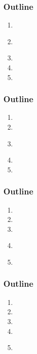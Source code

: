 \documentclass[usenames,dvipsnames]{beamer}
\begin{document}
\miniframesoff
  \begin{frame}
    \frametitle{\textbf{Outline}}
  \begin{enumerate}
    \item \introtitle
    \item \textbf{\firsttitle}
    \item \secondtitle
    \item \thirdtitle
    \item \conclusiontitle
  \end{enumerate}
  \end{frame}
\miniframeson



\miniframesoff
  \begin{frame}
    \frametitle{\textbf{Outline}}
  \begin{enumerate}
    \item \introtitle
    \item \firsttitle
    \item \textbf{\secondtitle}
    \item \thirdtitle
    \item \conclusiontitle
  \end{enumerate}
  \end{frame}
\miniframeson



\miniframesoff
  \begin{frame}
    \frametitle{\textbf{Outline}}
  \begin{enumerate}
    \item \introtitle
    \item \firsttitle
    \item \secondtitle
    \item \textbf{\thirdtitle}
    \item \conclusiontitle
  \end{enumerate}
  \end{frame}
\miniframeson


  
\miniframesoff
  \begin{frame}
    \frametitle{\textbf{Outline}}
  \begin{enumerate}
    \item \introtitle
    \item \firsttitle
    \item \secondtitle
    \item \thirdtitle
    \item \textbf{\conclusiontitle}
  \end{enumerate}
  \end{frame}
\miniframeson



\appendix

% 


\end{document}
